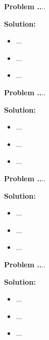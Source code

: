 \documentclass{article}
\theoremstyle{problemstyle}
\newenvironment{boxedproblem}[1]
{\begin{tcolorbox}[colback=white, colframe=black, boxrule=0.5pt]\noindent\textbf{Problem #1.}}
{\end{tcolorbox}}
\begin{document}
    
    \begin{boxedproblem}{40}
    ...
    \end{boxedproblem}
    
    \textbf{Solution:}
    \begin{itemize}[label={},leftmargin=1.25cm,nosep]
        \item ...
        \item ...
        \item ...
    \end{itemize}
    
    
\begin{boxedproblem}{41}
    ...
    \end{boxedproblem}
    
    \textbf{Solution:}
    \begin{itemize}[label={},leftmargin=1.25cm,nosep]
        \item ...
        \item ...
        \item ...
    \end{itemize}
    
    
    \begin{boxedproblem}{42}
    ...
    \end{boxedproblem}
    
    \textbf{Solution:}
    \begin{itemize}[label={},leftmargin=1.25cm,nosep]
        \item ...
        \item ...
        \item ...
    \end{itemize}
    
    
    \begin{boxedproblem}{43}
    ...
    \end{boxedproblem}
    
    \textbf{Solution:}
    \begin{itemize}[label={},leftmargin=1.25cm,nosep]
        \item ...
        \item ...
        \item ...
    \end{itemize}
    
\end{document}
